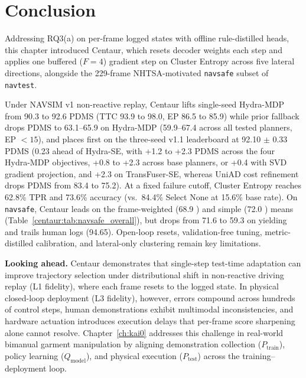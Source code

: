\FloatBarrier
\section{Conclusion}\label{centaur:sec:summary}

Addressing RQ3(a) on per-frame logged states with offline rule-distilled heads, this chapter introduced Centaur, which resets decoder weights each step and applies one buffered ($F=4$) gradient step on Cluster Entropy across five lateral directions, alongside the 229-frame NHTSA-motivated \texttt{navsafe} subset of \texttt{navtest}.

Under NAVSIM v1 non-reactive replay, Centaur lifts single-seed Hydra-MDP from 90.3 to 92.6 PDMS (TTC 93.9 to 98.0, EP 86.5 to 85.9) while prior fallback drops PDMS to 63.1--65.9 on Hydra-MDP (59.9--67.4 across all tested planners, EP $<15$), and places first on the three-seed v1.1 leaderboard at 92.10 $\pm$ 0.33 PDMS (0.23 ahead of Hydra-SE, with +1.2 to +2.3 PDMS across the four Hydra-MDP objectives, +0.8 to +2.3 across base planners, or +0.4 with SVD gradient projection, and +2.3 on TransFuser-SE, whereas UniAD cost refinement drops PDMS from 83.4 to 75.2). At a fixed failure cutoff, Cluster Entropy reaches 62.8\% TPR and 73.6\% accuracy (vs.\ 84.4\% Select None at 15.6\% base rate). On \texttt{navsafe}, Centaur leads on the frame-weighted (68.9 ) and simple (72.0 ) means (Table~\ref{centaur:tab:navsafe_overall}), but drops from 71.6 to 59.3 on yielding and trails human logs (94.65). Open-loop resets, validation-free tuning, metric-distilled calibration, and lateral-only clustering remain key limitations.

\textbf{Looking ahead.} Centaur demonstrates that single-step test-time adaptation can improve trajectory selection under distributional shift in non-reactive driving replay (L1 fidelity), where each frame resets to the logged state. In physical closed-loop deployment (L3 fidelity), however, errors compound across hundreds of control steps, human demonstrations exhibit multimodal inconsistencies, and hardware actuation introduces execution delays that per-frame score sharpening alone cannot resolve. Chapter~\ref{ch:kai0} addresses this challenge in real-world bimanual garment manipulation by aligning demonstration collection ($P_{\mathrm{train}}$), policy learning ($Q_{\mathrm{model}}$), and physical execution ($P_{\mathrm{test}}$) across the training--deployment loop.
